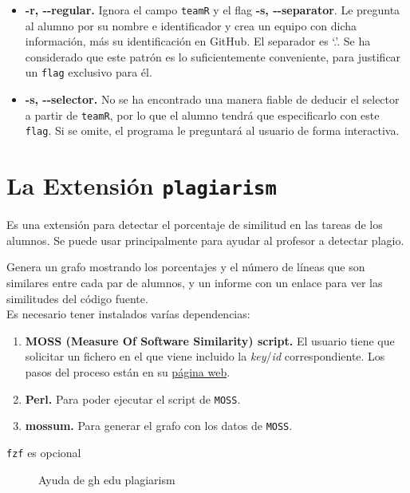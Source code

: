 \begin{itemize}
    \item \textbf{-r, -{}-regular.} Ignora el campo \verb|teamR| y el flag \textbf{-s, -{}-separator}. Le pregunta al alumno por su nombre e identificador y crea un equipo con dicha información, más su identificación en GitHub. El separador es \lq.\rq. Se ha considerado que este patrón es lo suficientemente conveniente, para justificar un \verb|flag| exclusivo para él.
    \item \textbf{-s, -{}-selector.} No se ha encontrado una manera fiable de deducir el selector a partir de \verb|teamR|, por lo que el alumno tendrá que especificarlo con este \verb|flag|. Si se omite, el programa le preguntará al usuario de forma interactiva.
\end{itemize}

\section{La Extensión {\tt plagiarism}}
Es una extensión para detectar el porcentaje de similitud en las tareas de los alumnos. Se puede usar principalmente para ayudar al profesor a detectar plagio.

Genera un grafo mostrando los porcentajes y el número de líneas que son similares entre cada par de alumnos, y un informe con un enlace para ver las similitudes del código fuente.\\
Es necesario tener instalados varías dependencias:
\begin{enumerate}
    \item \textbf{MOSS (Measure Of Software Similarity)\cite{MOSS} script.} El usuario tiene que solicitar un fichero en el que viene incluido la \emph{key}/\emph{id} correspondiente. Los pasos del proceso están en su \href{https://theory.stanford.edu/~aiken/moss/}{página web}.
    \item \textbf{Perl.} Para poder ejecutar el script de \verb|MOSS|.
    \item \textbf{mossum\cite{mossum}.} Para generar el grafo con los datos de \verb|MOSS|.
\end{enumerate}
\verb|fzf| es opcional
\begin{figure}[H]
    \centering
    \caption{Ayuda de gh edu plagiarism}
    \label{fig:plagiarismHelp}
\end{figure}

